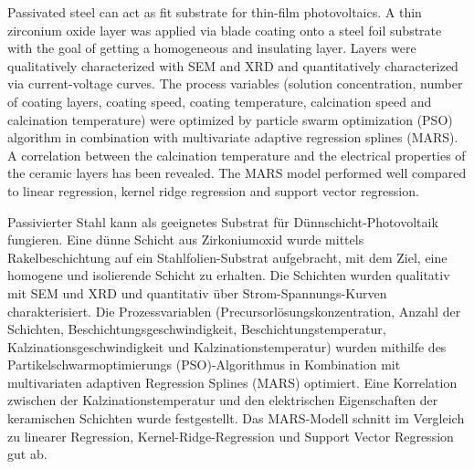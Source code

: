 Passivated steel can act as fit substrate for thin-film photovoltaics.
A thin zirconium oxide layer was applied via blade coating onto a steel foil substrate with the goal of getting a homogeneous and insulating layer.
Layers were qualitatively characterized with SEM and XRD and quantitatively characterized via current-voltage curves.
The process variables (solution concentration, number of coating layers, coating speed, coating temperature, calcination speed and calcination temperature) were optimized by particle swarm optimization (PSO) algorithm in combination with multivariate adaptive regression splines (MARS).
A correlation between the calcination temperature and the electrical properties of the ceramic layers has been revealed. 
The MARS model performed well compared to 
linear regression, kernel ridge regression and support vector regression.

\vspace{2em}

\noindent Passivierter Stahl kann als geeignetes Substrat für Dünnschicht-Photovoltaik fungieren. 
Eine dünne Schicht aus Zirkoniumoxid wurde mittels Rakelbeschichtung auf ein Stahlfolien-Substrat aufgebracht, mit dem Ziel, eine homogene und isolierende Schicht zu erhalten. 
Die Schichten wurden qualitativ mit SEM und XRD und quantitativ über Strom-Spannungs-Kurven charakterisiert. 
Die Prozessvariablen (Precursorlösungskonzentration, Anzahl der Schichten, Beschichtungsgeschwindigkeit, Beschichtungstemperatur, Kalzinationsgeschwindigkeit und Kalzinationstemperatur) wurden mithilfe des Partikelschwarmoptimierungs (PSO)-Algorithmus in Kombination mit multivariaten adaptiven Regression Splines (MARS) optimiert. Eine Korrelation zwischen der Kalzinationstemperatur und den elektrischen Eigenschaften der keramischen Schichten wurde festgestellt. Das MARS-Modell schnitt im Vergleich zu linearer Regression, Kernel-Ridge-Regression und Support Vector Regression gut ab.
